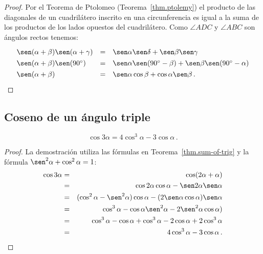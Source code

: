 \begin{proof}
Por el Teorema de Ptolomeo (Teorema~\ref{thm.ptolemy}) el producto de las diagonales de un cuadrilátero inscrito en una circunferencia es igual a la suma de los productos de los lados opuestos del cuadrilátero. Como $\angle ADC$ y $\angle ABC$ son ángulos rectos tenemos:
\[
\renewcommand{\arraystretch}{1.3}
\begin{array}{lcl}
\sen (\alpha+\beta)\sen(\alpha+\gamma)&=&
\sen \alpha \sen\delta + \sen \beta\sen \gamma\\
\sen (\alpha+\beta)\sen(90^\circ)&=&
\sen \alpha \sen(90^\circ-\beta) + \sen \beta\sen (90^\circ-\alpha)\\
\sen (\alpha+\beta)&=&\sen\alpha\cos\beta+\cos\alpha\sen \beta\,.
\end{array}
\]
\end{proof}

\newpage

\subsection{Coseno de un ángulo triple}\label{s.cosine}
\begin{theorem}\label{thm.triple-angle}
\[
\cos 3\alpha=4\cos^3\alpha -3\cos\alpha\,.
\]
\end{theorem}
\begin{proof}
La demostración utiliza las fórmulas en Teorema~\ref{thm.sum-of-trig} y la fórmula $\sen^2\alpha+\cos^2\alpha=1$:
\begin{eqnarray*}
\cos 3\alpha &=& \cos (2\alpha +\alpha)\\
&=& \cos 2\alpha\cos\alpha - \sen 2\alpha\sen\alpha\\
&=& (\cos^2\alpha -\sen^2\alpha)\cos\alpha - (2\sen\alpha\cos\alpha)\sen\alpha\\
&=&\cos^3\alpha - \cos\alpha\sen^2\alpha -2\sen^2\alpha\cos\alpha)\\
&=&\cos^3\alpha - \cos\alpha +\cos^3\alpha -2\cos\alpha+2\cos^3\alpha\\
&=&4\cos^3\alpha -3\cos\alpha\,.
\end{eqnarray*}
\end{proof}


